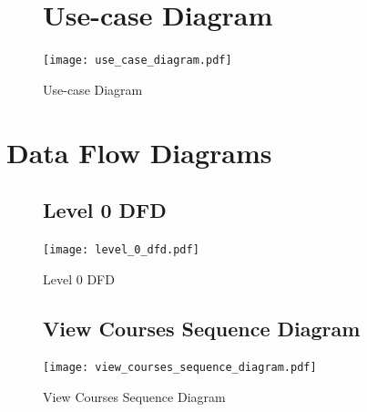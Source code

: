 \documentclass[12pt]{article}
\begin{document}


\begin{figure}[p!]
  \section{Use-case Diagram}
  \centering
  \texttt{[image: use\_case\_diagram.pdf]}
  \caption{Use-case Diagram}
\end{figure}

\section{Data Flow Diagrams}

\begin{figure}[p!]
  \subsection{Level 0 DFD}
  \centering
  \texttt{[image: level\_0\_dfd.pdf]}
  \caption{Level 0 DFD}
\end{figure}

\clearpage




\begin{figure}[p!]
  \subsection{View Courses Sequence Diagram}
  \centering
  \texttt{[image: view\_courses\_sequence\_diagram.pdf]}
  \caption{View Courses Sequence Diagram}
\end{figure}
\end{document}
